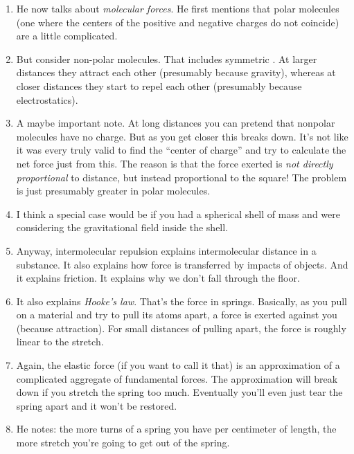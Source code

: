 \begin{enumerate}
  \item He now talks about \emph{molecular forces}. He first mentions
  that polar molecules (one where the centers of the positive and
  negative charges do not coincide) are a little complicated.

  \item But consider non-polar molecules. That includes symmetric
  . At larger distances they attract each other (presumably
  because gravity), whereas at closer distances they start to repel each
  other (presumably because electrostatics).

  \item A maybe important note. At long distances you can pretend that
  nonpolar molecules have no charge. But as you get closer this breaks
  down. It's not like it was every truly valid to find the ``center of
  charge'' and try to calculate the net force just from this. The reason
  is that the force exerted is \emph{not directly proportional} to
  distance, but instead proportional to the square! The problem is just
  presumably greater in polar molecules.

  \item I think a special case would be if you had a spherical shell of
  mass and were considering the gravitational field inside the shell.

  \item Anyway, intermolecular repulsion explains intermolecular
  distance in a substance. It also explains how force is transferred by
  impacts of objects. And it explains friction. It explains why we don't
  fall through the floor.

  \item It also explains \emph{Hooke's law}. That's the force in
  springs. Basically, as you pull on a material and try to pull its
  atoms apart, a force is exerted against you (because attraction). For
  small distances of pulling apart, the force is roughly linear to the
  stretch.

  \item Again, the elastic force (if you want to call it that) is an
  approximation of a complicated aggregate of fundamental forces. The
  approximation will break down if you stretch the spring too much.
  Eventually you'll even just tear the spring apart and it won't be
  restored.

  \item He notes: the more turns of a spring you have per centimeter of
  length, the more stretch you're going to get out of the spring.


\end{enumerate}
